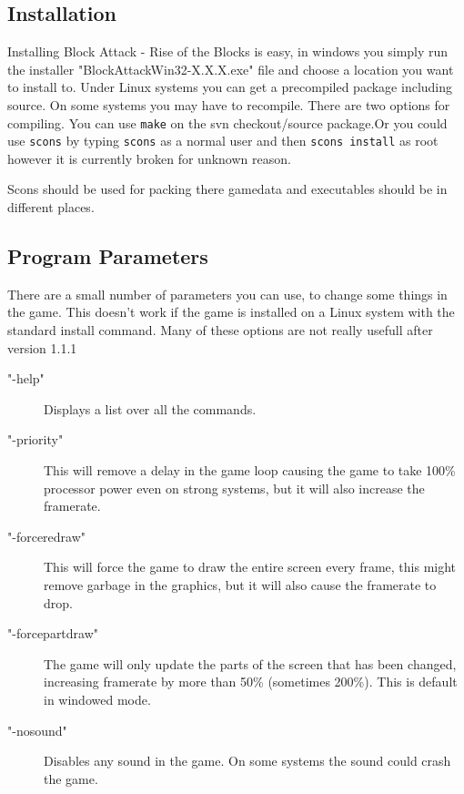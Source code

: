 \documentclass[11pt,a4paper]{article}
\begin{document}
\subsection{Installation}
Installing Block Attack - Rise of the Blocks is easy, in windows
you simply run the installer "BlockAttackWin32-X.X.X.exe" file and
choose a location you want to install to. Under Linux systems you
can get a precompiled package including source. On some systems
you may have to recompile. There are two options for compiling. You can use \verb+make+ on the svn checkout/source package.\newline Or you could use \verb+scons+ by typing \verb+scons+ as a normal user and then \verb+scons install+ as root however it is currently broken for unknown reason. \newline 

Scons should be used for packing there gamedata and executables should be in different places. 
\subsection{Program Parameters}
There are a small number of parameters you can use, to change some
things in the game. This doesn't work if the game is installed on a Linux system with the standard install command. Many of these options are not really usefull after version 1.1.1
\begin{description}
\item["-help"] Displays a list over all the commands.
\item["-priority"] This will remove a delay in the game loop
causing the game to take 100\% processor power even on strong
systems, but it will also increase the framerate.
\item["-forceredraw"] This will force the game to draw the entire
screen every frame, this might remove garbage in the graphics, but
it will also cause the framerate to drop. \item["-forcepartdraw"]
The game will only update the parts of the screen that has been
changed, increasing framerate by more than 50\% (sometimes 200\%).
This is default in windowed mode.
\item["-nosound"] Disables any sound in the game. On some systems the sound could crash the game.
\end{description}
\end{document}
